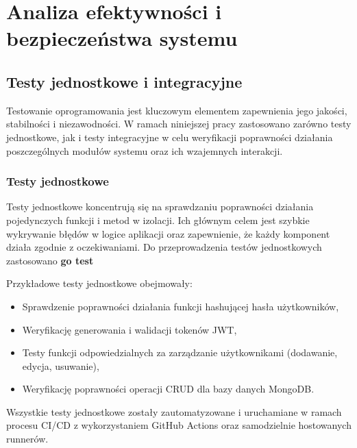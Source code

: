 \chapter{Analiza efektywności i bezpieczeństwa systemu}

\section{Testy jednostkowe i integracyjne}
Testowanie oprogramowania jest kluczowym elementem zapewnienia jego jakości, stabilności i niezawodności. W ramach niniejszej pracy zastosowano zarówno testy jednostkowe, jak i testy integracyjne w celu weryfikacji poprawności działania poszczególnych modułów systemu oraz ich wzajemnych interakcji.

\subsection{Testy jednostkowe}

Testy jednostkowe koncentrują się na sprawdzaniu poprawności działania pojedynczych funkcji i metod w izolacji. Ich głównym celem jest szybkie wykrywanie błędów w logice aplikacji oraz zapewnienie, że każdy komponent działa zgodnie z oczekiwaniami. Do przeprowadzenia testów jednostkowych zastosowano \textbf{go test}

Przykładowe testy jednostkowe obejmowały:
\begin{itemize}
    \item Sprawdzenie poprawności działania funkcji hashującej hasła użytkowników,
    \item Weryfikację generowania i walidacji tokenów JWT,
    \item Testy funkcji odpowiedzialnych za zarządzanie użytkownikami (dodawanie, edycja, usuwanie),
    \item Weryfikację poprawności operacji CRUD dla bazy danych MongoDB.
\end{itemize}

Wszystkie testy jednostkowe zostały zautomatyzowane i uruchamiane w ramach procesu CI/CD z wykorzystaniem GitHub Actions oraz samodzielnie hostowanych runnerów.

